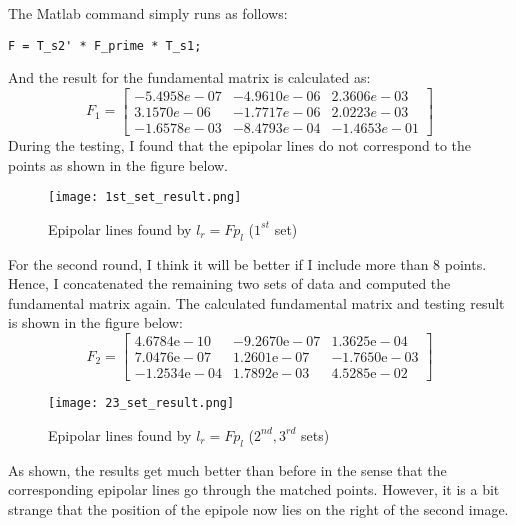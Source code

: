 \begin{questions}
\begin{parts}
\begin{subparts}
    \begin{solution}
        The Matlab command simply runs as follows:
        \begin{lstlisting}
F = T_s2' * F_prime * T_s1;
        \end{lstlisting}
        And the result for the fundamental matrix is calculated as:
        \begin{equation}
            F _ {1} = \left[\begin{array} { ccc } { - 5.4958 e - 07 } & { - 4.9610 e - 06 } & { 2.3606 e - 03 } \\ { 3.1570 e - 06 } & { - 1.7717 e - 06 } & { 2.0223 e - 03 } \\ { - 1.6578 e - 03 } & { - 8.4793 e - 04 } & {- 1.4653 e - 01 } \end{array}\right]
        \end{equation}
        During the testing, I found that the epipolar lines do not correspond to the points as shown in the figure below.
            \begin{figure}[H]
                \centering
                \texttt{[image: 1st\_set\_result.png]}
                \caption{Epipolar lines found by $l_{r} = Fp_{l}$ ($1^{st}$ set)}
            \end{figure}
        For the second round, I think it will be better if I include more than 8 points. Hence, I concatenated the remaining two sets of data and computed the fundamental matrix again. The calculated fundamental matrix and testing result is shown in the figure below:
        \begin{equation}
            F _ {2} = \left[\begin{array} { ccc } { 4.6784 \mathrm { e } - 10 } & { - 9.2670 \mathrm { e } - 07 } & { 1.3625 \mathrm { e } - 04 } \\ { 7.0476 \mathrm { e } - 07 } & { 1.2601 \mathrm { e } - 07 } & {- 1.7650  \mathrm { e } - 03 } \\ { - 1.2534 \mathrm { e } - 04 } & { 1.7892 \mathrm { e } - 03} & { 4.5285 \mathrm { e } - 02 } \end{array}\right]
        \end{equation}
            \begin{figure}[H]
                \centering
                \texttt{[image: 23\_set\_result.png]}
                \caption{Epipolar lines found by $l_{r} = Fp_{l}$ ($2^{nd}, 3^{rd} $ sets)}
            \end{figure}
        As shown, the results get much better than before in the sense that the corresponding epipolar lines go through the matched points. However, it is a bit strange that the position of the epipole now lies on the right of the second image.\\

\end{solution}
\end{subparts}
\end{parts}
\end{questions}
